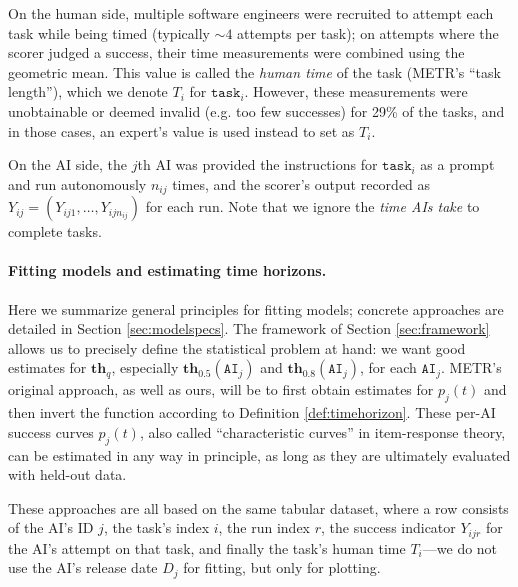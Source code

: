\documentclass{article}
\theoremstyle{definition}
\newcommand{\thq}[1][q]{\mathbf{th}_{#1}}
\newcommand{\task}{\texttt{task}}
\newcommand{\AI}{\texttt{AI}}
\begin{document}
On the human side, multiple software engineers were recruited to attempt each task while being timed (typically ${\sim}4$ attempts per task); on attempts where the scorer judged a success, their time measurements were combined using the geometric mean. This value is called the \emph{human time} of the task (METR's ``task length''), which we denote $T_i$ for $\task_i$. However, these measurements were unobtainable or deemed invalid (e.g. too few successes) for 29\% of the tasks, and in those cases, an expert's value is used instead to set as $T_i$. 

On the AI side, the $j$th AI was provided the instructions for $\task_i$ as a prompt and run autonomously $n_{ij}$ times, and the scorer's output recorded as $Y_{ij} = (Y_{ij1}, \dots, Y_{ijn_{ij}})$ for each run. Note that we ignore the \emph{time AIs take} to complete tasks.

\paragraph{Fitting models and estimating time horizons.} Here we summarize general principles for fitting models; concrete approaches are detailed in Section \ref{sec:modelspecs}. The framework of Section \ref{sec:framework} allows us to precisely define the statistical problem at hand: we want good estimates for $\thq$, especially $\thq[0.5](\AI_j)$ and $\thq[0.8](\AI_j)$, for each $\AI_j$. METR's original approach, as well as ours, will be to first obtain estimates for $p_j(t)$ and then invert the function according to Definition \ref{def:timehorizon}. These per-AI success curves $p_j(t)$, also called ``characteristic curves'' in item-response theory, can be estimated in any way in principle, as long as they are ultimately evaluated with held-out data. 

These approaches are all based on the same tabular dataset, where a row consists of the AI's ID $j$, the task's index $i$, the run index $r$, the success indicator $Y_{ijr}$ for the AI's attempt on that task, and finally the task's human time $T_i$---we do not use the AI's release date $D_j$ for fitting, but only for plotting.

\end{document}
